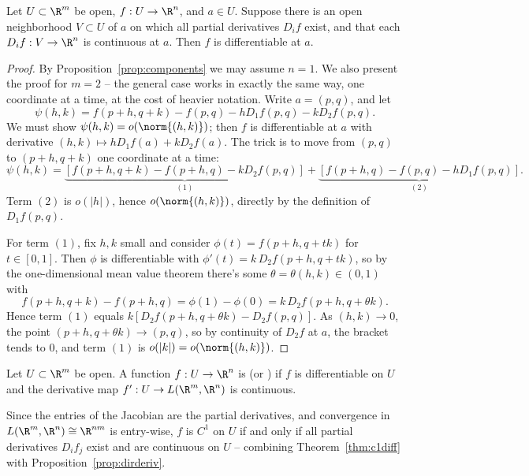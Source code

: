 \begin{theorem}\label{thm:c1diff}
    Let $U \subset \R^m$ be open, $f: U \rightarrow \R^n$, and $a \in U$. Suppose there is an open neighborhood $V \subset U$ of $a$ on which all partial derivatives $D_i f$ exist, and that each $D_i f: V \rightarrow \R^n$ is continuous at $a$. Then $f$ is differentiable at $a$.
\end{theorem}
\begin{proof}
    By Proposition~\ref{prop:components} we may assume $n = 1$. We also present the proof for $m = 2$ -- the general case works in exactly the same way, one coordinate at a time, at the cost of heavier notation. Write $a = (p, q)$, and let
    $$
    \psi(h, k) = f(p + h, q + k) - f(p, q) - hD_1f(p, q) - kD_2f(p, q).
    $$
    We must show $\psi(h, k) = o(\norm{(h,k)})$; then $f$ is differentiable at $a$ with derivative $(h, k) \mapsto hD_1f(a) + kD_2f(a)$. The trick is to move from $(p, q)$ to $(p + h, q + k)$ one coordinate at a time:
    $$
    \psi(h, k) = \underbrace{\left[f(p + h, q + k) - f(p + h, q) - kD_2f(p, q)\right]}_{(1)} + \underbrace{\left[f(p + h, q) - f(p, q) - hD_1f(p, q)\right]}_{(2)}.
    $$
    Term $(2)$ is $o(|h|)$, hence $o(\norm{(h, k)})$, directly by the definition of $D_1 f(p, q)$.

    For term $(1)$, fix $h, k$ small and consider $\phi(t) = f(p + h, q + tk)$ for $t \in [0, 1]$. Then $\phi$ is differentiable with $\phi'(t) = k \, D_2 f(p + h, q + tk)$, so by the one-dimensional mean value theorem there's some $\theta = \theta(h, k) \in (0, 1)$ with
    $$
    f(p + h, q + k) - f(p + h, q) = \phi(1) - \phi(0) = k\,D_2f(p + h, q + \theta k).
    $$
    Hence term $(1)$ equals $k\left[D_2f(p + h, q + \theta k) - D_2f(p, q)\right]$. As $(h, k) \rightarrow 0$, the point $(p + h, q + \theta k) \rightarrow (p, q)$, so by continuity of $D_2 f$ at $a$, the bracket tends to $0$, and term $(1)$ is $o(|k|) = o(\norm{(h,k)})$.
\end{proof}

\begin{definition}[$C^1$ Function]
    Let $U \subset \R^m$ be open. A function $f: U \rightarrow \R^n$ is  (or ) if $f$ is differentiable on $U$ and the derivative map $f': U \rightarrow L(\R^m, \R^n)$ is continuous.
\end{definition}

Since the entries of the Jacobian are the partial derivatives, and convergence in $L(\R^m, \R^n) \cong \R^{nm}$ is entry-wise, $f$ is $C^1$ on $U$ if and only if all partial derivatives $D_if_j$ exist and are continuous on $U$ -- combining Theorem~\ref{thm:c1diff} with Proposition~\ref{prop:dirderiv}.

